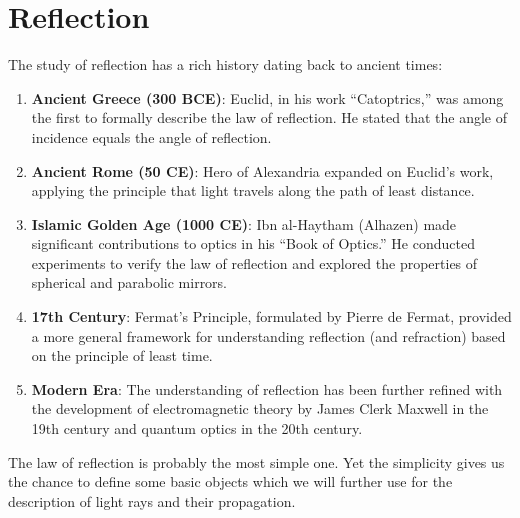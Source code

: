 \documentclass[
  a4paper,
]{book}
\begin{document}
\chapter{Reflection}\label{reflection}

\begin{tcolorbox}[enhanced jigsaw, coltitle=black, title=\textcolor{quarto-callout-note-color}{\faInfo}\hspace{0.5em}{Historical Context of Reflection Laws}, colframe=quarto-callout-note-color-frame, toprule=.15mm, opacitybacktitle=0.6, left=2mm, opacityback=0, breakable, toptitle=1mm, bottomtitle=1mm, leftrule=.75mm, arc=.35mm, titlerule=0mm, colbacktitle=quarto-callout-note-color!10!white, rightrule=.15mm, bottomrule=.15mm, colback=white]

The study of reflection has a rich history dating back to ancient times:

\begin{enumerate}
\def\labelenumi{\arabic{enumi}.}
\item
  \textbf{Ancient Greece (300 BCE)}: Euclid, in his work ``Catoptrics,''
  was among the first to formally describe the law of reflection. He
  stated that the angle of incidence equals the angle of reflection.
\item
  \textbf{Ancient Rome (50 CE)}: Hero of Alexandria expanded on Euclid's
  work, applying the principle that light travels along the path of
  least distance.
\item
  \textbf{Islamic Golden Age (1000 CE)}: Ibn al-Haytham (Alhazen) made
  significant contributions to optics in his ``Book of Optics.'' He
  conducted experiments to verify the law of reflection and explored the
  properties of spherical and parabolic mirrors.
\item
  \textbf{17th Century}: Fermat's Principle, formulated by Pierre de
  Fermat, provided a more general framework for understanding reflection
  (and refraction) based on the principle of least time.
\item
  \textbf{Modern Era}: The understanding of reflection has been further
  refined with the development of electromagnetic theory by James Clerk
  Maxwell in the 19th century and quantum optics in the 20th century.
\end{enumerate}

\end{tcolorbox}

The law of reflection is probably the most simple one. Yet the
simplicity gives us the chance to define some basic objects which we
will further use for the description of light rays and their
propagation.
\end{document}
